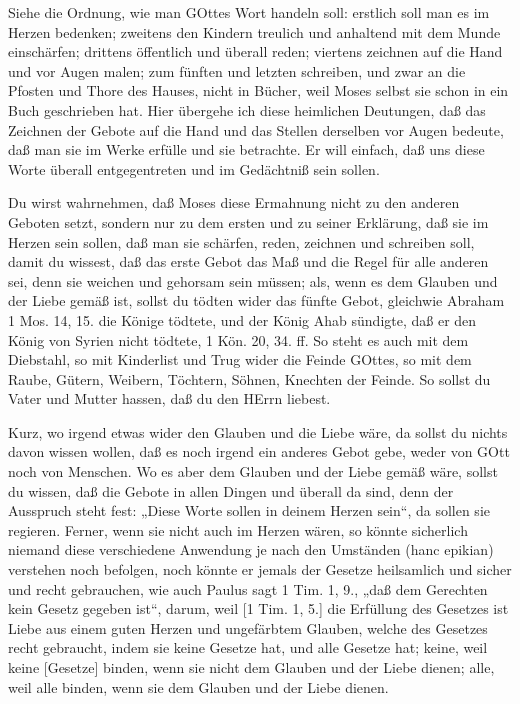 Siehe die Ordnung, wie man GOttes Wort handeln soll: erstlich soll man es im Herzen bedenken; zweitens den Kindern treulich und anhaltend mit dem Munde einschärfen; drittens öffentlich und überall reden; viertens zeichnen auf die Hand und vor Augen malen; zum fünften und letzten schreiben, und zwar an die Pfosten und Thore des Hauses, nicht in Bücher, weil Moses selbst sie schon in ein Buch geschrieben hat. Hier übergehe ich diese heimlichen Deutungen, daß das Zeichnen der Gebote auf die Hand und das Stellen derselben vor Augen bedeute, daß man sie im Werke erfülle und sie betrachte. Er will einfach, daß uns diese Worte überall entgegentreten und im Gedächtniß sein sollen.

Du wirst wahrnehmen, daß Moses diese Ermahnung nicht zu den anderen Geboten setzt, sondern nur zu dem ersten und zu seiner Erklärung, daß sie im Herzen sein sollen, daß man sie schärfen, reden, zeichnen und schreiben soll, damit du wissest, daß das erste Gebot das Maß und die Regel für alle anderen sei, denn sie weichen und gehorsam sein müssen; als, wenn es dem Glauben und der Liebe gemäß ist, sollst du tödten wider das fünfte Gebot, gleichwie Abraham 1 Mos. 14, 15. die Könige tödtete, und der König Ahab sündigte, daß er den König von Syrien nicht tödtete, 1 Kön. 20, 34. ff. So steht es auch mit dem Diebstahl, so mit Kinderlist und Trug wider die Feinde GOttes, so mit dem Raube, Gütern, Weibern, Töchtern, Söhnen, Knechten der Feinde. So sollst du Vater und Mutter hassen, daß du den HErrn liebest.

Kurz, wo irgend etwas wider den Glauben und die Liebe wäre, da sollst du nichts davon wissen wollen, daß es noch irgend ein anderes Gebot gebe, weder von GOtt noch von Menschen. Wo es aber dem Glauben und der Liebe gemäß wäre, sollst du wissen, daß die Gebote in allen Dingen und überall da sind, denn der Ausspruch steht fest: „Diese Worte sollen in deinem Herzen sein“, da sollen sie regieren. Ferner, wenn sie nicht auch im Herzen wären, so könnte sicherlich niemand diese verschiedene Anwendung je nach den Umständen (hanc epikian) verstehen noch befolgen, noch könnte er jemals der Gesetze heilsamlich und sicher und recht gebrauchen, wie auch Paulus sagt 1 Tim. 1, 9., „daß dem Gerechten kein Gesetz gegeben ist“, darum, weil [1 Tim. 1, 5.] die Erfüllung des Gesetzes ist Liebe aus einem guten Herzen und ungefärbtem Glauben, welche des Gesetzes recht gebraucht, indem sie keine Gesetze hat, und
alle Gesetze hat; keine, weil keine [Gesetze] binden, wenn sie nicht dem Glauben und der Liebe dienen; alle, weil alle binden, wenn sie dem Glauben und der Liebe dienen.

